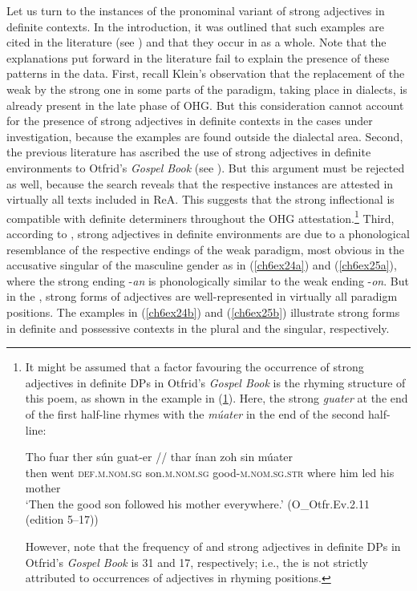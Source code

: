 \documentclass[output=paper,colorlinks,citecolor=brown]{langscibook}
\begin{document}
Let us turn to the instances of the pronominal variant of strong
adjectives in definite contexts. In the introduction, it was outlined
that such examples are cited in the literature (see \citealp[185--188]{behaghel1923deutsche}) and that they occur in  as a whole. Note that the
explanations put forward in the literature fail to explain the presence
of these patterns in the data. First, recall Klein's \citeyearpar[200]{klein2007semantischen}
observation that the replacement of the weak  by the strong
one in some parts of the paradigm, taking place in 
dialects, is already present in the late phase of OHG. But this
consideration cannot account for the presence of strong adjectives in
definite contexts in the cases under investigation, because the examples
are found outside the  dialectal area. Second, the
previous literature has ascribed the use of strong adjectives in
definite environments to Otfrid's \emph{Gospel Book} (see \citealp[298]{Braune2018AHD}). But this argument must be rejected as well, because the 
search reveals that the respective instances are attested in virtually
all texts included in ReA. This suggests that the strong inflectional
 is compatible with definite determiners throughout the OHG
attestation.\footnote{It might be assumed that a factor favouring the
  occurrence of strong adjectives in definite DPs in Otfrid's
  \emph{Gospel Book} is the rhyming structure of this poem, as shown in
  the example in (\ref{ch6exii}). Here, the strong  \emph{guater} at the
  end of the first half-line rhymes with the  \emph{múater} in the
  end of the second half-line:
  
\begin{exe}
\ex\label{ch6exii}
\gll Tho fuar ther sún guat-er //  thar ínan zoh sin múater \\
then went \textsc{def.m.nom.sg} son.\textsc{m.nom.sg} good-\textsc{m.nom.sg.str} {}  where him led his mother\\
\glt `Then the good son followed his mother everywhere.' (O\_Otfr.Ev.2.11 (edition 5--17))
\end{exe}

However, note that the frequency of  and  strong adjectives in definite DPs in Otfrid's \emph{Gospel Book} is 31 and 17, respectively; i.e., the  is not strictly attributed to  occurrences of adjectives in rhyming positions.} Third, according to
\citet[750]{Wilmanns09}, strong adjectives in definite environments are due
to a phonological resemblance of the respective endings of the weak
paradigm, most obvious in the accusative singular of the masculine
gender as in (\ref{ch6ex24a}) and (\ref{ch6ex25a}), where the strong ending -\emph{an} is
phonologically similar to the weak ending -\emph{on}. But in the ,
strong forms of adjectives are well-represented in virtually all
paradigm positions. The examples in (\ref{ch6ex24b}) and (\ref{ch6ex25b}) illustrate strong
forms in definite and possessive contexts in the  plural and the
 singular, respectively.
\end{document}
